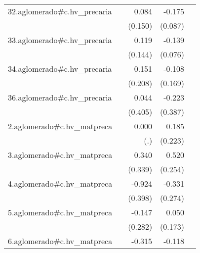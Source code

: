 {\begin{longtable}{l*{4}{D{.}{.}{-1}}}
\addlinespace
32.aglomerado#c.hv\_precaria&                     &       0.084         &      -0.175\sym{*}  &                     \\
            &                     &     (0.150)         &     (0.087)         &                     \\
\addlinespace
33.aglomerado#c.hv\_precaria&                     &       0.119         &      -0.139         &                     \\
            &                     &     (0.144)         &     (0.076)         &                     \\
\addlinespace
34.aglomerado#c.hv\_precaria&                     &       0.151         &      -0.108         &                     \\
            &                     &     (0.208)         &     (0.169)         &                     \\
\addlinespace
36.aglomerado#c.hv\_precaria&                     &       0.044         &      -0.223         &                     \\
            &                     &     (0.405)         &     (0.387)         &                     \\
\addlinespace
2.aglomerado#c.hv\_matpreca&                     &       0.000         &       0.185         &                     \\
            &                     &         (.)         &     (0.223)         &                     \\
\addlinespace
3.aglomerado#c.hv\_matpreca&                     &       0.340         &       0.520\sym{*}  &                     \\
            &                     &     (0.339)         &     (0.254)         &                     \\
\addlinespace
4.aglomerado#c.hv\_matpreca&                     &      -0.924\sym{*}  &      -0.331         &                     \\
            &                     &     (0.398)         &     (0.274)         &                     \\
\addlinespace
5.aglomerado#c.hv\_matpreca&                     &      -0.147         &       0.050         &                     \\
            &                     &     (0.282)         &     (0.173)         &                     \\
\addlinespace
6.aglomerado#c.hv\_matpreca&                     &      -0.315         &      -0.118         &                     \\

\end{longtable}}
